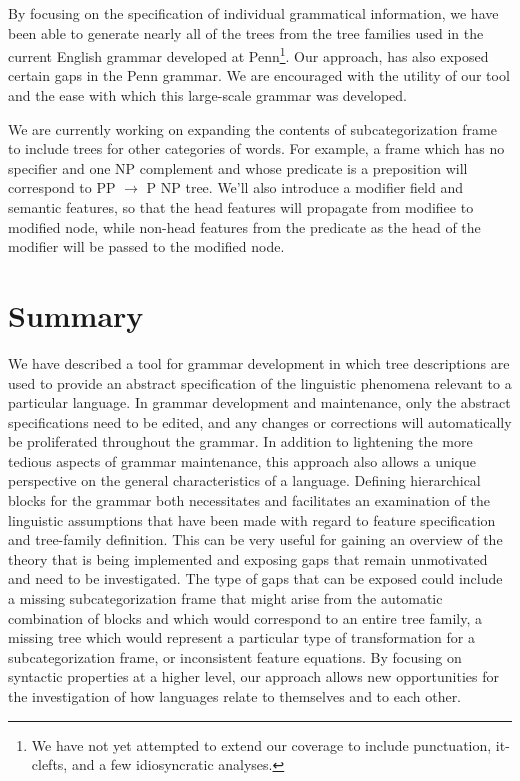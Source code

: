 By focusing on the specification of individual grammatical information, we
have been able to generate nearly all of the trees from the tree families 
used in the current English grammar developed at Penn\footnote{We have not yet
attempted to extend our coverage to include punctuation, it-clefts, and a few
idiosyncratic analyses.}. 
 Our approach, has also exposed certain gaps in the Penn grammar.
We are encouraged with the utility of our tool and the ease with which this
large-scale grammar was developed.


We are currently working on expanding the contents of
subcategorization frame to include 
trees for other categories of words. For example, 
a frame which has no specifier and one NP complement
and whose predicate is a preposition will correspond to
PP $\rightarrow$ P NP tree. We'll also introduce a modifier field
and semantic features, so that the head features will propagate
from modifiee to modified node, while non-head features from
the predicate as the head of the modifier will be passed to
the modified node.







\section{Summary}

We have described a tool for grammar development in which tree descriptions are
used to provide an abstract specification of the linguistic phenomena relevant
to a particular language.  In grammar development and maintenance, only the
abstract specifications need to be edited, and any changes or corrections will
automatically be proliferated throughout the grammar.  In addition to
lightening the more tedious aspects of grammar maintenance, this approach also
allows a unique perspective on the general characteristics of a language.
Defining hierarchical blocks for the grammar both necessitates and facilitates
an examination of the linguistic assumptions that have been made with regard to
feature specification and tree-family definition. This can be very useful for
gaining an overview of the theory that is being implemented and exposing gaps
that remain unmotivated and need to be investigated.  The type of gaps that can
be exposed could include a missing subcategorization frame that might arise
from the automatic combination of blocks and which would correspond to an
entire tree family, a missing tree which would represent a particular type of
transformation for a subcategorization frame, or inconsistent feature
equations.  By focusing on syntactic properties at a higher level, our
approach allows new opportunities for the investigation of how languages relate
to themselves and to each other.
 


%

%
